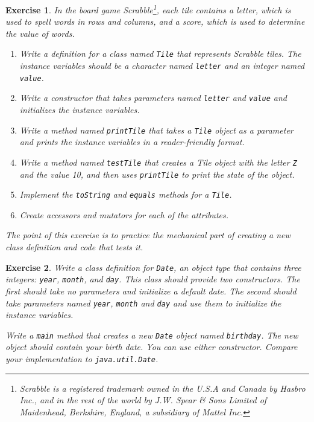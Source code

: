 \documentclass[12pt]{book}
\theoremstyle{exercise}
\newtheorem{exercise}{Exercise}[chapter]
\newcommand{\java}[1]{\verb"#1"}
\newcommand{\java}[1]{\lstinline{#1}} %
\begin{document}
\begin{exercise}
In the board game Scrabble\footnote{Scrabble is a registered trademark owned in the U.S.A and Canada by Hasbro Inc., and in the rest of the world by J.W. Spear \& Sons Limited of Maidenhead, Berkshire, England, a subsidiary of Mattel Inc.}, each tile contains a letter, which is used to spell words in rows and columns, and a score, which is used to determine the value of words.

\begin{enumerate}

\item Write a definition for a class named \java{Tile} that represents Scrabble tiles.
The instance variables should be a character named \java{letter} and an integer named \java{value}.

\item Write a constructor that takes parameters named \java{letter} and \java{value} and initializes the instance variables.

\item Write a method named \java{printTile} that takes a \java{Tile} object as a parameter and prints the instance variables in a reader-friendly format.

\item Write a method named \java{testTile} that creates a Tile object with the letter \java{Z} and the value 10, and then uses \java{printTile} to print the state of the object.

\item Implement the \java{toString} and \java{equals} methods for a \java{Tile}.

\item Create accessors and mutators for each of the attributes.

\end{enumerate}

The point of this exercise is to practice the mechanical part of creating a new class definition and code that tests it.
\end{exercise}


\begin{exercise}
Write a class definition for \java{Date}, an object type that contains three integers: \java{year}, \java{month}, and \java{day}.
This class should provide two constructors.
The first should take no parameters and initialize a default date.
The second should take parameters named \java{year}, \java{month} and \java{day} and use them to initialize the instance variables.

Write a \java{main} method that creates a new \java{Date} object named \java{birthday}.
The new object should contain your birth date.
You can use either constructor.
Compare your implementation to \java{java.util.Date}.
\end{exercise}
\end{document}
